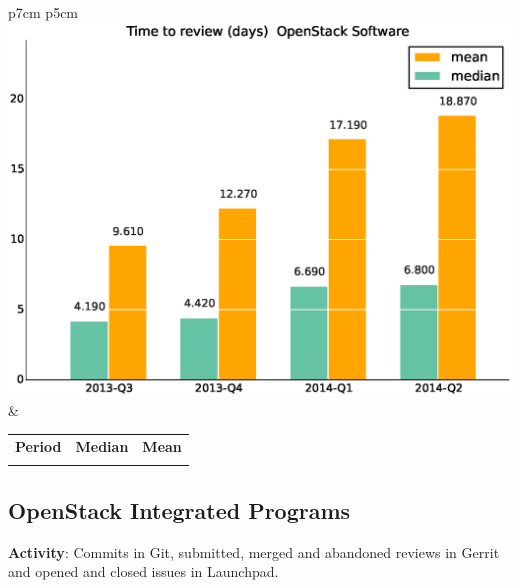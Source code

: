 \documentclass[a4wide,11pt]{report}
\begin{document}
\begin{tabular}{p{7cm} p{5cm}}
    \vspace{0pt} 
    \includegraphics[scale=.35]{figs/timetoreview_medianOpenStackSoftware.eps}
    & 
    \vspace{0pt}
    \begin{tabular}{l|r|r|}%
    \bfseries Period & \bfseries Median & \bfseries Mean %
    \csvreader[head to column names]{data/timetoreview_medianOpenStackSoftware.csv}{}%
    {\\ & \mediantime & \meantime}
    \end{tabular}
\end{tabular}

\newpage

\subsection{OpenStack Integrated Programs}

\textbf{Activity}: Commits in Git, submitted, merged and abandoned reviews in Gerrit and opened and closed issues in Launchpad.
\end{document}
